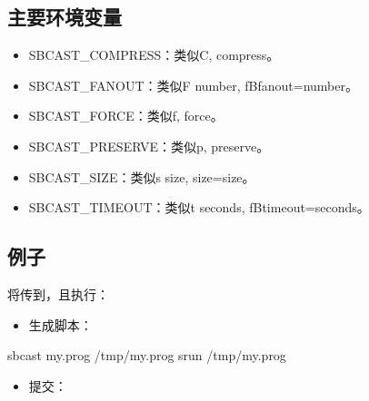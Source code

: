 \documentclass[a4paper,12pt,english]{sphinxmanual}
\begin{document}
\subsection{主要环境变量}
\label{\detokenize{slurm/slurm:id39}}\begin{itemize}
\item {} 
\sphinxAtStartPar
SBCAST\_COMPRESS：类似\sphinxhyphen{}C, \sphinxhyphen{}\sphinxhyphen{}compress。

\item {} 
\sphinxAtStartPar
SBCAST\_FANOUT：类似\sphinxhyphen{}F number, fB\sphinxhyphen{}\sphinxhyphen{}fanout=number。

\item {} 
\sphinxAtStartPar
SBCAST\_FORCE：类似\sphinxhyphen{}f, \sphinxhyphen{}\sphinxhyphen{}force。

\item {} 
\sphinxAtStartPar
SBCAST\_PRESERVE：类似\sphinxhyphen{}p, \sphinxhyphen{}\sphinxhyphen{}preserve。

\item {} 
\sphinxAtStartPar
SBCAST\_SIZE：类似\sphinxhyphen{}s size, \sphinxhyphen{}\sphinxhyphen{}size=size。

\item {} 
\sphinxAtStartPar
SBCAST\_TIMEOUT：类似\sphinxhyphen{}t seconds, fB\sphinxhyphen{}\sphinxhyphen{}timeout=seconds。

\end{itemize}


\subsection{例子}
\label{\detokenize{slurm/slurm:id40}}\label{\detokenize{slurm/slurm:id41}}
\sphinxAtStartPar
将传到，且执行：
\begin{itemize}
\item {} 
\sphinxAtStartPar
生成脚本：

\end{itemize}

\begin{sphinxVerbatim}[commandchars=\\\{\}]
sbcast my.prog /tmp/my.prog
srun /tmp/my.prog
\end{sphinxVerbatim}
\begin{itemize}
\item {} 
\sphinxAtStartPar
提交：

\sphinxAtStartPar
{}

\end{itemize}
\end{document}
